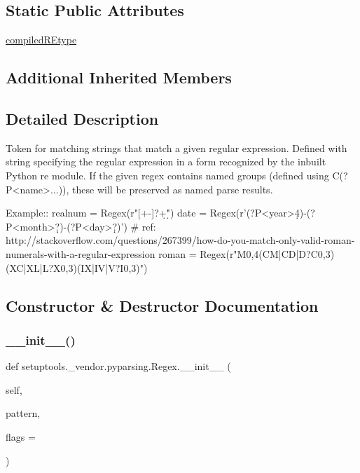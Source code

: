 \subsection*{Static Public Attributes}
\begin{DoxyCompactItemize}
\item 
\hyperlink{classsetuptools_1_1__vendor_1_1pyparsing_1_1Regex_aea3ba60353e2d9d2b47b2e5ebc0a4785}{compiled\+R\+Etype}
\end{DoxyCompactItemize}
\subsection*{Additional Inherited Members}


\subsection{Detailed Description}
\begin{DoxyVerb}Token for matching strings that match a given regular expression.
Defined with string specifying the regular expression in a form recognized by the inbuilt Python re module.
If the given regex contains named groups (defined using C{(?P<name>...)}), these will be preserved as 
named parse results.

Example::
    realnum = Regex(r"[+-]?\d+\.\d*")
    date = Regex(r'(?P<year>\d{4})-(?P<month>\d\d?)-(?P<day>\d\d?)')
    # ref: http://stackoverflow.com/questions/267399/how-do-you-match-only-valid-roman-numerals-with-a-regular-expression
    roman = Regex(r"M{0,4}(CM|CD|D?C{0,3})(XC|XL|L?X{0,3})(IX|IV|V?I{0,3})")
\end{DoxyVerb}
 

\subsection{Constructor \& Destructor Documentation}
\mbox{\label{classsetuptools_1_1__vendor_1_1pyparsing_1_1Regex_a2bf2a91eb8c1faa95c32ec015dfe6a2a}} 
\subsubsection{\texorpdfstring{\+\_\+\+\_\+init\+\_\+\+\_\+()}{\_\_init\_\_()}}
{\footnotesize\ttfamily def setuptools.\+\_\+vendor.\+pyparsing.\+Regex.\+\_\+\+\_\+init\+\_\+\+\_\+ (\begin{DoxyParamCaption}\item[{}]{self,  }\item[{}]{pattern,  }\item[{}]{flags = {} }\end{DoxyParamCaption})}

